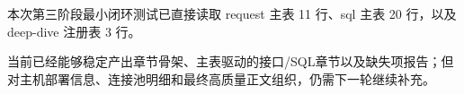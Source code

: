 
本次第三阶段最小闭环测试已直接读取 request 主表 11 行、sql 主表 20 行，以及 deep-dive 注册表 3 行。\par

当前已经能够稳定产出章节骨架、主表驱动的接口/SQL章节以及缺失项报告；但对主机部署信息、连接池明细和最终高质量正文组织，仍需下一轮继续补充。\par
